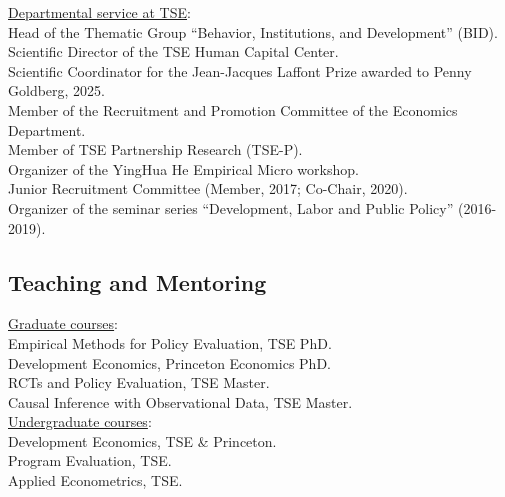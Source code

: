 \documentclass[12pt,english]{article}
\begin{document}
\noindent \underline{Departmental service at TSE}: \\
Head of the Thematic Group ``Behavior, Institutions, and Development'' (BID).\vspace{0.2cm}\\
Scientific Director of the TSE Human Capital Center.\vspace{0.2cm}\\
Scientific Coordinator for the Jean-Jacques Laffont Prize awarded to Penny Goldberg, 2025.\vspace{0.2cm}\\
Member of the Recruitment and Promotion Committee of the Economics Department.\vspace{0.2cm}\\
Member of TSE Partnership Research (TSE-P). \vspace{0.2cm}\\
Organizer of the YingHua He Empirical Micro workshop.\vspace{0.2cm}\\
Junior Recruitment Committee (Member, 2017; Co-Chair, 2020).\vspace{0.2cm}\\
Organizer of the seminar series ``Development, Labor and Public Policy'' (2016-2019).


\subsection*{Teaching and Mentoring}
\underline{Graduate courses}: \\
Empirical Methods for Policy Evaluation, TSE PhD.\vspace{0.2cm} \\
Development Economics, Princeton Economics PhD.\vspace{0.2cm} \\
RCTs and Policy Evaluation, TSE Master. \vspace{0.2cm} \\
Causal Inference with Observational Data, TSE Master. \\

\noindent \underline{Undergraduate courses}: \\
Development Economics, TSE \& Princeton. \vspace{0.2cm}\\
Program Evaluation, TSE. \vspace{0.2cm}\\
Applied Econometrics, TSE. \\
\end{document}
